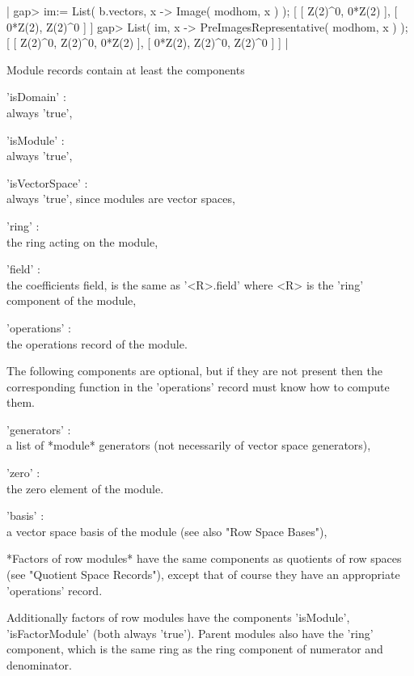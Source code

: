 |    gap> im:= List( b.vectors, x -> Image( modhom, x ) );
    [ [ Z(2)^0, 0*Z(2) ], [ 0*Z(2), Z(2)^0 ] ]
    gap> List( im, x -> PreImagesRepresentative( modhom, x ) );
    [ [ Z(2)^0, Z(2)^0, 0*Z(2) ], [ 0*Z(2), Z(2)^0, Z(2)^0 ] ] |


Module records contain at least the components

'isDomain' : \\
    always 'true',

'isModule' : \\
    always 'true',

'isVectorSpace' : \\
    always 'true', since modules are vector spaces,

'ring' : \\
    the ring acting on the module,

'field' : \\
    the coefficients field, is the same as '<R>.field' where <R> is
    the 'ring' component of the module,

'operations' : \\
    the operations record of the module.

The following components are optional, but if they are not present then
the corresponding function in the 'operations' record must know how to
compute them.

'generators' : \\
    a list of *module* generators (not necessarily of vector space
    generators),

'zero' : \\
    the zero element of the module.

'basis' : \\
    a vector space basis of the module (see also "Row Space Bases"),

\vspace{5mm}

*Factors of row modules* have the same components as quotients of row spaces
(see "Quotient Space Records"), except that of course they have an
appropriate 'operations' record.

Additionally factors of row modules have the components 'isModule',
'isFactorModule' (both always 'true').  Parent modules also have the
'ring' component, which is the same ring as the ring component of
numerator and denominator.


